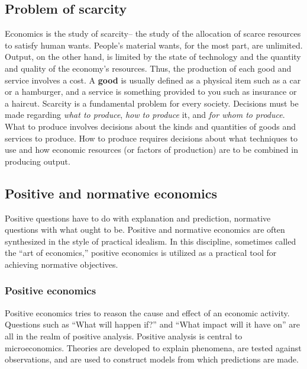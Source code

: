 \documentclass[11pt,]{book}
\theoremstyle{definition}
\theoremstyle{definition}
\theoremstyle{definition}
\theoremstyle{remark}
\begin{document}
\subsection{Problem of scarcity}\label{problem-of-scarcity}

Economics is the study of scarcity-- the study of the allocation of
scarce resources to satisfy human wants. People's material wants, for
the most part, are unlimited. Output, on the other hand, is limited by
the state of technology and the quantity and quality of the economy's
resources. Thus, the production of each good and service involves a
cost. A \textbf{good} is usually defined as a physical item such as a
car or a hamburger, and a service is something provided to you such as
insurance or a haircut. Scarcity is a fundamental problem for every
society. Decisions must be made regarding \emph{what to produce},
\emph{how to produce} it, and \emph{for whom to produce}. What to
produce involves decisions about the kinds and quantities of goods and
services to produce. How to produce requires decisions about what
techniques to use and how economic resources (or factors of production)
are to be combined in producing output.

\subsection{Positive and normative
economics}\label{positive-and-normative-economics}

Positive questions have to do with explanation and prediction, normative
questions with what ought to be. Positive and normative economics are
often synthesized in the style of practical idealism. In this
discipline, sometimes called the ``art of economics,'' positive
economics is utilized as a practical tool for achieving normative
objectives.

\subsubsection{Positive economics}\label{positive-economics}

Positive economics tries to reason the cause and effect of an economic
activity. Questions such as ``What will happen if?'' and ``What impact
will it have on'' are all in the realm of positive analysis. Positive
analysis is central to microeconomics. Theories are developed to explain
phenomena, are tested against observations, and are used to construct
models from which predictions are made.
\end{document}
